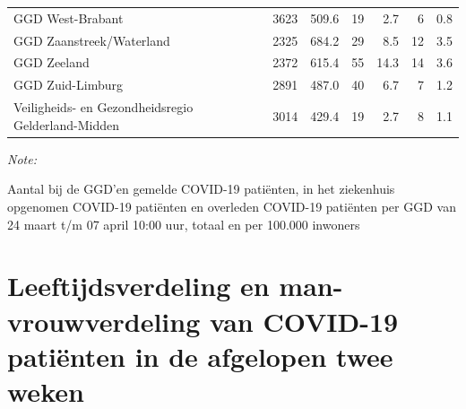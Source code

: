 \documentclass[
  english,
  man,floatsintext]{apa6}
\begin{document}
\begin{table}
\begin{threeparttable}
\begin{tabular}{lrrrrrr}
GGD West-Brabant & 3623 & 509.6 & 19 & 2.7 & 6 & 0.8\\
GGD Zaanstreek/Waterland & 2325 & 684.2 & 29 & 8.5 & 12 & 3.5\\
GGD Zeeland & 2372 & 615.4 & 55 & 14.3 & 14 & 3.6\\
GGD Zuid-Limburg & 2891 & 487.0 & 40 & 6.7 & 7 & 1.2\\
Veiligheids- en Gezondheidsregio Gelderland-Midden & 3014 & 429.4 & 19 & 2.7 & 8 & 1.1\\
\bottomrule
\end{tabular}
\begin{tablenotes}
\item \textit{Note: } 
\item Aantal bij de GGD’en gemelde COVID-19 patiënten, in het ziekenhuis opgenomen COVID-19 patiënten en overleden COVID-19 patiënten per GGD van 24 maart t/m 07 april 10:00 uur, totaal en per 100.000 inwoners
\end{tablenotes}
\end{threeparttable}
\endgroup{}
\end{table}

\newpage

\hypertarget{leeftijdsverdeling-en-man-vrouwverdeling-van-covid-19-patiuxebnten-in-de-afgelopen-twee-weken}{%
\section{Leeftijdsverdeling en man-vrouwverdeling van COVID-19 patiënten in de afgelopen twee weken}\label{leeftijdsverdeling-en-man-vrouwverdeling-van-covid-19-patiuxebnten-in-de-afgelopen-twee-weken}}
\end{document}
